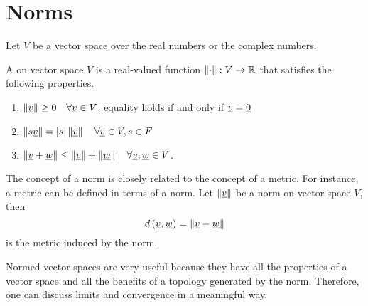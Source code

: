 \section{Norms}
Let $V$ be a vector space over the real numbers or the complex numbers.

A  on vector space $V$ is a real-valued function $\left\| \cdot \right\| : V \rightarrow \mathbb{R}$ that satisfies the following properties.
\begin{enumerate}
\item $\left\| \underline{v} \right\| \geq 0 \quad \forall \underline{v} \in V$;
equality holds if and only if $\underline{v} = \underline{0}$
\item $\left\| s \underline{v} \right\| = |s| \left\| \underline{v} \right\| \quad \forall \underline{v} \in V, s \in F$
\item $\left\| \underline{v} + \underline{w} \right\| \leq
\left\| \underline{v} \right\| + \left\| \underline{w} \right\| \quad \forall \underline{v}, \underline{w} \in V$.
\end{enumerate}

The concept of a norm is closely related to the concept of a metric.
For instance, a metric can be defined in terms of a norm.
Let $\left\| \underline{v} \right\|$ be a norm on vector space $V$, then
\begin{equation*}
d \left( \underline{v}, \underline{w} \right)
= \left\| \underline{v} - \underline{w} \right\|
\end{equation*}
is the metric induced by the norm.

Normed vector spaces are very useful because they have all the properties of a vector space and all the benefits of a topology generated by the norm.
Therefore, one can discuss limits and convergence in a meaningful way.

